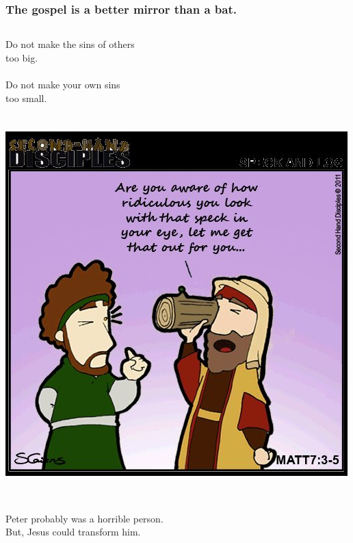\begin{frame}
\frametitle{The gospel is a better mirror than a bat.}
\begin{columns}
\column{5cm}
Do not make the sins of others\\too big.\\~\\
Do not make your own sins\\too small.\\~\\~\\
\column{5cm}
\includegraphics[width=\textwidth]{graphics/beam.jpg}\\
\end{columns}
~\\Peter probably was a horrible person.\\
But, Jesus could transform him.
\end{frame}

